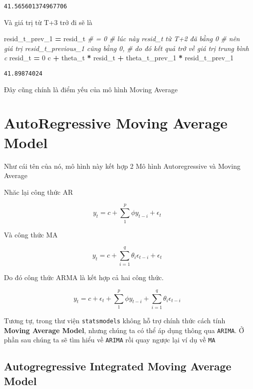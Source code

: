 \documentclass[
]{book}
\newenvironment{Shaded}{\begin{snugshade}}{\end{snugshade}}
\newcommand{\CommentTok}[1]{\textcolor[rgb]{0.56,0.35,0.01}{\textit{#1}}}
\newcommand{\DecValTok}[1]{\textcolor[rgb]{0.00,0.00,0.81}{#1}}
\newcommand{\NormalTok}[1]{#1}
\newcommand{\OperatorTok}[1]{\textcolor[rgb]{0.81,0.36,0.00}{\textbf{#1}}}
\begin{document}
\begin{verbatim}
41.565601374967706
\end{verbatim}

Và giá trị từ T+3 trở đi sẽ là

\begin{Shaded}
\begin{Highlighting}[]
\NormalTok{resid\_t\_prev\_1 }\OperatorTok{=}\NormalTok{ resid\_t }\CommentTok{\# = 0}
\CommentTok{\# lúc này resid\_t từ T+2 đã bằng 0 }
\CommentTok{\# nên giá trị resid\_t\_previous\_1 cũng bằng 0, }
\CommentTok{\# do đó kết quả trở về giá trị trung bình c}
\NormalTok{resid\_t }\OperatorTok{=} \DecValTok{0}
\NormalTok{c }\OperatorTok{+}\NormalTok{ theta\_t }\OperatorTok{*}\NormalTok{ resid\_t }\OperatorTok{+}\NormalTok{ theta\_t\_prev\_1 }\OperatorTok{*}\NormalTok{ resid\_t\_prev\_1}
\end{Highlighting}
\end{Shaded}

\begin{verbatim}
41.89874024
\end{verbatim}

Đây cũng chính là điểm yếu của mô hình Moving Average

\hypertarget{autoregressive-moving-average-model}{%
\section{AutoRegressive Moving Average Model}\label{autoregressive-moving-average-model}}

Như cái tên của nó, mô hình này kết hợp 2 Mô hình Autoregressive và Moving Average

Nhăc lại công thức AR

\[
y_t = c + \sum^{p}_{1}\phi y_{t-i} + \epsilon_t
\]

Và công thức MA

\[
y_t = c  + \sum^{q}_{i=1}\theta_{i}\epsilon_{t-i} +  \epsilon_t
\]

Do đó công thức ARMA là kết hợp cả hai công thức.

\[
y_t = c + \epsilon_t + \sum^{p}_{1}\phi y_{t-i}  + \sum^{q}_{i=1}\theta_{i}\epsilon_{t-i}
\]

Tương tự, trong thư viện \texttt{statsmodels} không hỗ trợ chính thức cách tính \textbf{Moving Average Model}, nhưng chúng ta có thể áp dụng thông qua \texttt{ARIMA}. Ở phần sau chúng ta sẽ tìm hiểu về \texttt{ARIMA} rồi quay ngược lại ví dụ về \texttt{MA}

\hypertarget{autogregressive-integrated-moving-average-model}{%
\subsection{Autogregressive Integrated Moving Average Model}\label{autogregressive-integrated-moving-average-model}}

\printindex
\end{document}
